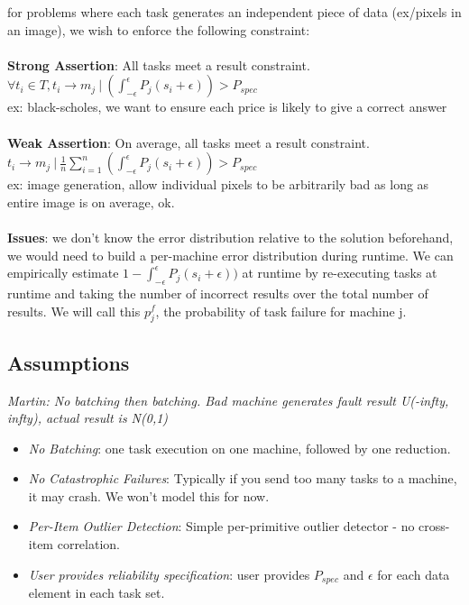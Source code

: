 \documentclass[11pt, oneside]{article}   	%
\begin{document}
for problems where each task generates an independent piece of data (ex/pixels in an image), we wish to enforce the following constraint:\\\\
\textbf{Strong Assertion}: All tasks meet a result constraint.\\ $\forall t_i \in T, t_i \rightarrow m_j ~|~ (\int_{-\epsilon}^{\epsilon} P_j(s_i+ \epsilon)) > P_{spec}$\\
ex: black-scholes, we want to ensure each price is likely to give a correct answer\\\\
\textbf{Weak Assertion}: On average, all tasks meet a result constraint.\\ $t_i \rightarrow m_j ~|~ \frac 1 {n} \sum_{i=1}^n (\int_{-\epsilon}^{\epsilon} P_j(s_i+ \epsilon)) > P_{spec}$\\
ex: image generation, allow individual pixels to be arbitrarily bad as long as entire image is on average, ok.\\\\
\textbf{Issues}: we don't know the error distribution relative to the solution beforehand, we would need to build a per-machine error distribution during runtime. We can empirically estimate $1-\int_{-\epsilon}^{\epsilon} P_j(s_i+ \epsilon))$ at runtime by re-executing tasks at runtime and taking the number of incorrect results over the total number of results. We will call this $p_j^f$, the probability of task failure for machine j.
\subsection {Assumptions}
\textit{Martin: No batching then batching. Bad machine generates fault result U(-infty, infty), actual result is N(0,1)}
\begin{itemize}
	\item \textit{No Batching}: one task execution on one machine, followed by one reduction. 
	\item \textit{No Catastrophic Failures}: Typically if you send too many tasks to a machine, it may crash. We won't model this for now.
	\item \textit{Per-Item Outlier Detection}: Simple per-primitive outlier detector - no cross-item correlation.
	\item \textit{User provides reliability specification}: user provides $P_{spec}$ and $\epsilon$ for each data element in each task set.
\end{itemize}
\end{document}
